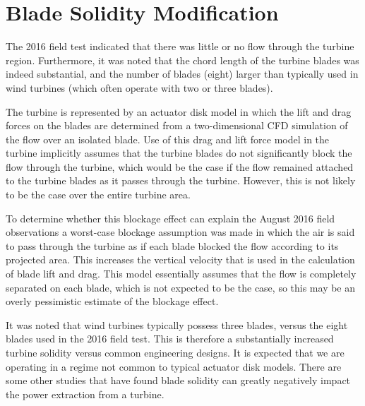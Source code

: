 \section{Blade Solidity Modification}
\label{sec:solidity}
%
%

The 2016 field test indicated that there was little or no flow through
the turbine region. Furthermore, it was noted that the chord length of
the turbine blades was indeed substantial, and the number of blades
(eight) larger than typically used in wind turbines (which often operate
with two or three blades). 

The turbine is represented by an actuator disk model in which the lift
and drag forces on the blades are determined from a two-dimensional CFD 
simulation of the flow over an isolated blade. Use of this drag 
and lift force model in the turbine implicitly assumes that the 
turbine blades do not significantly block the flow through the 
turbine, which would be the case if the flow remained attached 
to the turbine blades as it passes through the turbine. However, 
this is not likely to be the case over the entire turbine area. 

To determine whether this blockage effect can explain the August 2016
field observations a worst-case blockage assumption was made in which
the air is said to pass through the turbine as if each blade blocked the
flow according to its projected area. This increases the vertical
velocity that is used in the calculation of blade lift and drag. This
model essentially assumes that the flow is completely separated on each
blade, which is not expected to be the case, so this may be an overly
pessimistic estimate of the blockage effect. 

It was noted that wind turbines typically possess three blades, versus
 the eight blades used in the 2016 field test. This is therefore a 
 substantially increased turbine solidity versus common engineering
 designs. It is expected that we are operating in a regime not common to
 typical actuator disk models. There are some other studies that have
 found blade solidity can greatly negatively impact the power extraction
 from a turbine\cite{solidity_oxford}. 




